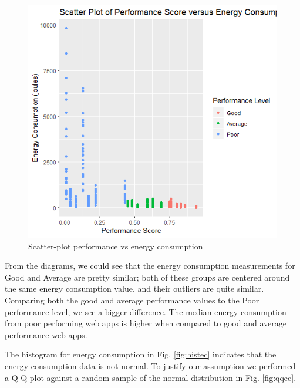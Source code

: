 \begin{figure}[H]
  \includegraphics[width=\linewidth]{./NewImages/Fig_6_Scatterplot_Perf_score_Energy.png}
  \caption{Scatter-plot performance vs energy consumption}
  \label{fig:scatpvsec}
\end{figure}

From the diagrams, we could see that the energy consumption measurements for Good and Average are pretty similar; both of these groups are centered around the same energy consumption value, and their outliers are quite similar. Comparing both the good and average performance values to the Poor performance level, we see a bigger difference. The median energy consumption from poor performing web apps is higher when compared to good and average performance web apps. \newline

The histogram for energy consumption in Fig. \ref{fig:histec} indicates that the energy consumption data is not normal. To justify our assumption we performed a Q-Q plot against a random sample of the normal distribution in Fig. \ref{fig:qqec}.

